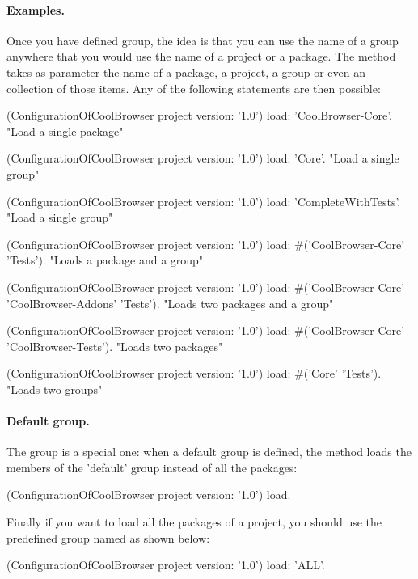 \documentclass[a4paper,10pt,twoside]{book}
\begin{document}
\paragraph{Examples.} Once you have defined group, the idea is that you can use the name of a group anywhere that you would use the name of a project or a package. The   method takes as parameter the name of a package, a project, a group or even an collection of those items.  Any of the following statements are then possible:

 
\begin{code}{}
(ConfigurationOfCoolBrowser project version: '1.0') load: 'CoolBrowser-Core'. 
	"Load a single package"

(ConfigurationOfCoolBrowser project version: '1.0') load: 'Core'. 
	"Load a single group"

(ConfigurationOfCoolBrowser project version: '1.0') load: 'CompleteWithTests'.  
	"Load a single group"
 
(ConfigurationOfCoolBrowser project version: '1.0') 
	load: #('CoolBrowser-Core' 'Tests').    
	"Loads a package and a group"

(ConfigurationOfCoolBrowser project version: '1.0') load: #('CoolBrowser-Core' 'CoolBrowser-Addons' 'Tests'). 
	"Loads two packages and a group" 

 (ConfigurationOfCoolBrowser project version: '1.0') load: #('CoolBrowser-Core' 'CoolBrowser-Tests').
	"Loads two packages"
  
(ConfigurationOfCoolBrowser project version: '1.0') load: #('Core' 'Tests'). 
	"Loads two groups"
\end{code}


\paragraph{Default group.} The  group is a special one: when a default group is defined, the  method loads the members of the 'default' group instead of all the packages:
    
\begin{code}{}
(ConfigurationOfCoolBrowser project version: '1.0') load.
\end{code}

Finally if you want to load all the packages of a project, you should use the predefined group named  as shown below: 

\begin{code}{}
(ConfigurationOfCoolBrowser project version: '1.0') load: 'ALL'.
\end{code}
 
\end{document}
